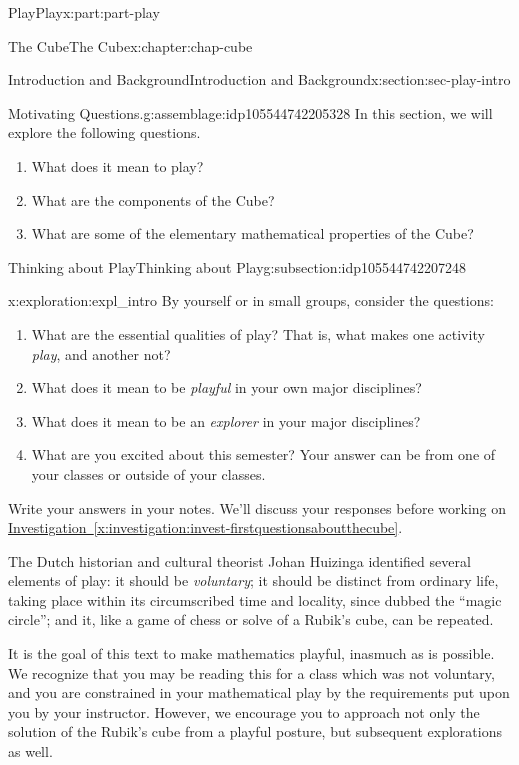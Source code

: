 \documentclass[oneside,10pt,]{book}
\newcommand{\xreffont}{\relax}
\numberwithin{equation}{section}
\begin{document}
\begin{partptx}{Play}{}{Play}{}{}{x:part:part-play}
\begin{chapterptx}{The Cube}{}{The Cube}{}{}{x:chapter:chap-cube}
\begin{sectionptx}{Introduction and Background}{}{Introduction and Background}{}{}{x:section:sec-play-intro}
\begin{introduction}{}
\begin{assemblage}{Motivating Questions.}{g:assemblage:idp105544742205328}%
In this section, we will explore the following questions. %
\begin{enumerate}
\item{}What does it mean to play?%
\item{}What are the components of the Cube?%
\item{}What are some of the elementary mathematical properties of the Cube?%
\end{enumerate}
%
\end{assemblage}
\end{introduction}%
%
%
\typeout{************************************************}
\typeout{************************************************}
%
\begin{subsectionptx}{Thinking about Play}{}{Thinking about Play}{}{}{g:subsection:idp105544742207248}
\begin{exploration}{}{x:exploration:expl_intro}%
By yourself or in small groups, consider the questions: %
\begin{enumerate}
\item{}What are the essential qualities of play? That is, what makes one activity \emph{play}, and another not?%
\item{}What does it mean to be \emph{playful} in your own major disciplines?%
\item{}What does it mean to be an \emph{explorer} in your major disciplines?%
\item{}What are you excited about this semester? Your answer can be from one of your classes or outside of your classes.%
\end{enumerate}
 Write your answers in your notes. We'll discuss your responses before working on \hyperref[x:investigation:invest-firstquestionsaboutthecube]{Investigation~{\xreffont\ref{x:investigation:invest-firstquestionsaboutthecube}}}.%
\end{exploration}%
The Dutch historian and cultural theorist Johan Huizinga identified several elements of play: it should be \emph{voluntary}; it should be distinct from ordinary life, taking place within its circumscribed time and locality, since dubbed the ``magic circle''; and it, like a game of chess or solve of a Rubik's cube, can be repeated.%
\par
It is the goal of this text to make mathematics playful, inasmuch as is possible. We recognize that you may be reading this for a class which was not voluntary, and you are constrained in your mathematical play by the requirements put upon you by your instructor. However, we encourage you to approach not only the solution of the Rubik's cube from a playful posture, but subsequent explorations as well.%

\end{subsectionptx}
\end{sectionptx}
\end{chapterptx}
\end{partptx}
\end{document}
